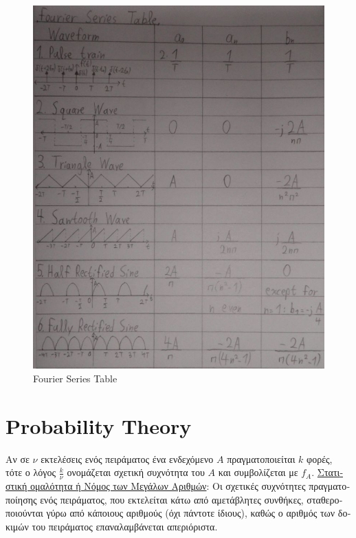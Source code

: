 \documentclass[12pt]{article}
\begin{document}
\begin{flushleft}
	\begin{figure}[p]
	\centering
	\includegraphics[scale=0.55]{fourierSeriesTable}
	\caption{Fourier Series Table}
	\label{fig:fourierSeriesTable}
	\end{figure}
	
	
	\pagebreak
	
	
	\section{Probability Theory}
	
	\textbullet \quad \textgreek{Αν σε} $\nu$ \textgreek{εκτελέσεις ενός πειράματος ένα ενδεχόμενο} $A$ \textgreek{πραγματοποιείται} $k$ \textgreek{φορές, τότε ο λόγος} $\frac{k}{\nu}$ \textgreek{ονομάζεται σχετική συχνότητα του} $A$ \textgreek{και συμβολίζεται με} $f_A$. \linebreak 
	\textbullet \quad \textgreek{\uline{Στατιστική ομαλότητα ή Νόμος των Μεγάλων Αριθμών}}: \textgreek{Οι σχετικές συχνότητες πραγματοποίησης ενός πειράματος, που εκτελείται κάτω από αμετάβλητες συνθήκες, σταθεροποιούνται γύρω από κάποιους αριθμούς (όχι πάντοτε ίδιους), καθώς ο αριθμός των δοκιμών του πειράματος επαναλαμβάνεται απεριόριστα}. \linebreak 
	

\end{flushleft}
\end{document}
